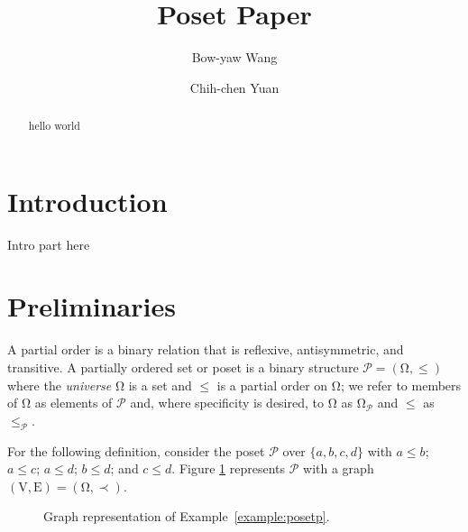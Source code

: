 \documentclass{llncs}
\begin{document}
\title{Poset Paper}
\author{Bow-yaw Wang \and Chih-chen Yuan}
\maketitle

\begin{abstract}
hello world
\end{abstract}

\section{Introduction}
Intro part here

\section{Preliminaries}

A partial order is a binary relation that is reflexive, antisymmetric, and transitive. A partially ordered set or poset is a binary structure $\mathcal{P} = (\mathrm{\Omega}, \leq)$ where the \emph{universe} $\mathrm{\Omega}$ is a set and $\leq$ is a partial order on $\mathrm{\Omega}$; we refer to members of $\mathrm{\Omega}$ as elements of $\mathcal{P}$ and, where specificity is desired, to $\mathrm{\Omega}$ as $\mathrm{\Omega}_{\mathcal{P}}$ and $\leq$ as $\leq_{\mathcal{P}}$.

\begin{example}
    For the following definition, consider the poset $\mathcal{P}$ over $\{a,b,c,d\}$ with $a \leq b$; $a \leq c$; $a \leq d$; $b \leq d$; and $c \leq d$. Figure \ref{figure:posetp} represents $\mathcal{P}$ with a graph $(\mathrm{V},\mathrm{E}) = (\mathrm{\Omega},\prec)$.
    \label{example:posetp}
\end{example}

\begin{figure}
\centering
\vspace{1cm}
\caption{Graph representation of Example~\ref{example:posetp}.}
\label{figure:posetp}
\end{figure}
\end{document}
